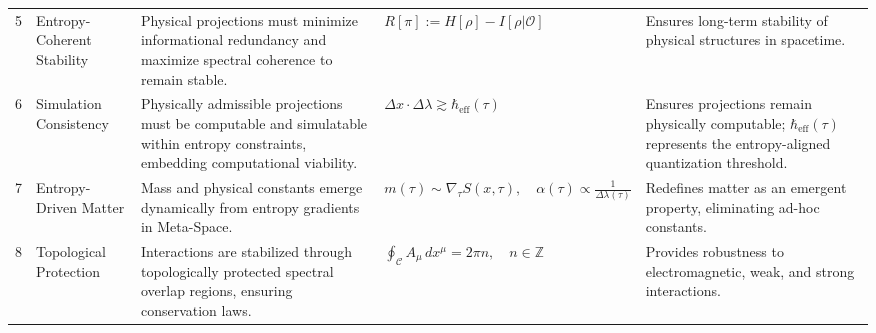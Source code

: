 \documentclass[10.5pt,a4paper]{article}
\begin{document}
{\begin{longtable}{r p{3.5cm} p{6cm} p{5cm} p{5cm}}
5 & Entropy-Coherent Stability & Physical projections must minimize informational redundancy and maximize spectral coherence to remain stable. & 
\( R[\pi] := H[\rho] - I[\rho | \mathcal{O}] \) & Ensures long-term stability of physical structures in spacetime. \\

6 & Simulation Consistency & Physically admissible projections must be computable and simulatable within entropy constraints, embedding computational viability. & 
\( \Delta x \cdot \Delta \lambda \gtrsim \hbar_{\text{eff}}(\tau) \) & Ensures projections remain physically computable; \( \hbar_{\text{eff}}(\tau) \) represents the entropy-aligned quantization threshold. \\

7 & Entropy-Driven Matter & Mass and physical constants emerge dynamically from entropy gradients in Meta-Space. & 
\( m(\tau) \sim \nabla_\tau S(x, \tau), \quad \alpha(\tau) \propto \frac{1}{\Delta \lambda(\tau)} \) & Redefines matter as an emergent property, eliminating ad-hoc constants. \\

8 & Topological Protection & Interactions are stabilized through topologically protected spectral overlap regions, ensuring conservation laws. & 
\( \oint_{\mathcal{C}} A_\mu \, dx^\mu = 2\pi n, \quad n \in \mathbb{Z} \) & Provides robustness to electromagnetic, weak, and strong interactions. \\

\end{longtable}
}
\end{document}
